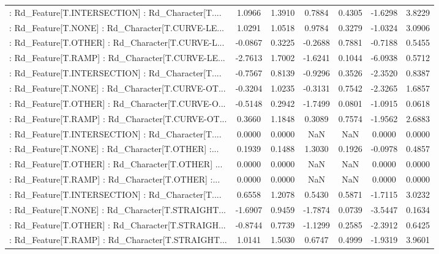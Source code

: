 \begin{longtable}{p{4cm}cccccc}
 : Rd\_Feature[T.INTERSECTION] : Rd\_Character[T.... &  1.0966 &    1.3910 &  0.7884 &       0.4305 & -1.6298 &  3.8229 \\
 : Rd\_Feature[T.NONE] : Rd\_Character[T.CURVE-LE... &  1.0291 &    1.0518 &  0.9784 &       0.3279 & -1.0324 &  3.0906 \\
 : Rd\_Feature[T.OTHER] : Rd\_Character[T.CURVE-L... & -0.0867 &    0.3225 & -0.2688 &       0.7881 & -0.7188 &  0.5455 \\
 : Rd\_Feature[T.RAMP] : Rd\_Character[T.CURVE-LE... & -2.7613 &    1.7002 & -1.6241 &       0.1044 & -6.0938 &  0.5712 \\
 : Rd\_Feature[T.INTERSECTION] : Rd\_Character[T.... & -0.7567 &    0.8139 & -0.9296 &       0.3526 & -2.3520 &  0.8387 \\
 : Rd\_Feature[T.NONE] : Rd\_Character[T.CURVE-OT... & -0.3204 &    1.0235 & -0.3131 &       0.7542 & -2.3265 &  1.6857 \\
 : Rd\_Feature[T.OTHER] : Rd\_Character[T.CURVE-O... & -0.5148 &    0.2942 & -1.7499 &       0.0801 & -1.0915 &  0.0618 \\
 : Rd\_Feature[T.RAMP] : Rd\_Character[T.CURVE-OT... &  0.3660 &    1.1848 &  0.3089 &       0.7574 & -1.9562 &  2.6883 \\
 : Rd\_Feature[T.INTERSECTION] : Rd\_Character[T.... &  0.0000 &    0.0000 &     NaN &          NaN &  0.0000 &  0.0000 \\
 : Rd\_Feature[T.NONE] : Rd\_Character[T.OTHER] :... &  0.1939 &    0.1488 &  1.3030 &       0.1926 & -0.0978 &  0.4857 \\
 : Rd\_Feature[T.OTHER] : Rd\_Character[T.OTHER] ... &  0.0000 &    0.0000 &     NaN &          NaN &  0.0000 &  0.0000 \\
 : Rd\_Feature[T.RAMP] : Rd\_Character[T.OTHER] :... &  0.0000 &    0.0000 &     NaN &          NaN &  0.0000 &  0.0000 \\
 : Rd\_Feature[T.INTERSECTION] : Rd\_Character[T.... &  0.6558 &    1.2078 &  0.5430 &       0.5871 & -1.7115 &  3.0232 \\
 : Rd\_Feature[T.NONE] : Rd\_Character[T.STRAIGHT... & -1.6907 &    0.9459 & -1.7874 &       0.0739 & -3.5447 &  0.1634 \\
 : Rd\_Feature[T.OTHER] : Rd\_Character[T.STRAIGH... & -0.8744 &    0.7739 & -1.1299 &       0.2585 & -2.3912 &  0.6425 \\
 : Rd\_Feature[T.RAMP] : Rd\_Character[T.STRAIGHT... &  1.0141 &    1.5030 &  0.6747 &       0.4999 & -1.9319 &  3.9601 \\

\end{longtable}

